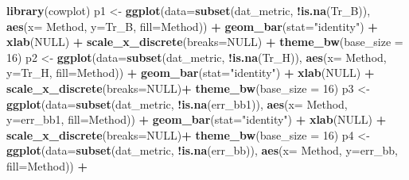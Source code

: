 \documentclass[
]{article}
\newenvironment{Shaded}{\begin{snugshade}}{\end{snugshade}}
\newcommand{\DataTypeTok}[1]{\textcolor[rgb]{0.13,0.29,0.53}{#1}}
\newcommand{\DecValTok}[1]{\textcolor[rgb]{0.00,0.00,0.81}{#1}}
\newcommand{\KeywordTok}[1]{\textcolor[rgb]{0.13,0.29,0.53}{\textbf{#1}}}
\newcommand{\NormalTok}[1]{#1}
\newcommand{\OperatorTok}[1]{\textcolor[rgb]{0.81,0.36,0.00}{\textbf{#1}}}
\newcommand{\OtherTok}[1]{\textcolor[rgb]{0.56,0.35,0.01}{#1}}
\newcommand{\StringTok}[1]{\textcolor[rgb]{0.31,0.60,0.02}{#1}}
\begin{document}
\begin{Shaded}
\begin{Highlighting}[]
\KeywordTok{library}\NormalTok{(cowplot)}
\NormalTok{p1 <-}\StringTok{ }\KeywordTok{ggplot}\NormalTok{(}\DataTypeTok{data=}\KeywordTok{subset}\NormalTok{(dat_metric, }\OperatorTok{!}\KeywordTok{is.na}\NormalTok{(Tr_B)), }\KeywordTok{aes}\NormalTok{(}\DataTypeTok{x=}\NormalTok{ Method, }\DataTypeTok{y=}\NormalTok{Tr_B, }\DataTypeTok{fill=}\NormalTok{Method)) }\OperatorTok{+}
\StringTok{  }\KeywordTok{geom_bar}\NormalTok{(}\DataTypeTok{stat=}\StringTok{"identity"}\NormalTok{) }\OperatorTok{+}\StringTok{ }\KeywordTok{xlab}\NormalTok{(}\OtherTok{NULL}\NormalTok{) }\OperatorTok{+}\StringTok{ }\KeywordTok{scale_x_discrete}\NormalTok{(}\DataTypeTok{breaks=}\OtherTok{NULL}\NormalTok{) }\OperatorTok{+}\StringTok{ }\KeywordTok{theme_bw}\NormalTok{(}\DataTypeTok{base_size =} \DecValTok{16}\NormalTok{)}
\NormalTok{p2 <-}\StringTok{ }\KeywordTok{ggplot}\NormalTok{(}\DataTypeTok{data=}\KeywordTok{subset}\NormalTok{(dat_metric, }\OperatorTok{!}\KeywordTok{is.na}\NormalTok{(Tr_H)), }\KeywordTok{aes}\NormalTok{(}\DataTypeTok{x=}\NormalTok{ Method, }\DataTypeTok{y=}\NormalTok{Tr_H, }\DataTypeTok{fill=}\NormalTok{Method)) }\OperatorTok{+}
\StringTok{  }\KeywordTok{geom_bar}\NormalTok{(}\DataTypeTok{stat=}\StringTok{"identity"}\NormalTok{) }\OperatorTok{+}\StringTok{ }\KeywordTok{xlab}\NormalTok{(}\OtherTok{NULL}\NormalTok{) }\OperatorTok{+}\StringTok{ }\KeywordTok{scale_x_discrete}\NormalTok{(}\DataTypeTok{breaks=}\OtherTok{NULL}\NormalTok{)}\OperatorTok{+}\StringTok{ }\KeywordTok{theme_bw}\NormalTok{(}\DataTypeTok{base_size =} \DecValTok{16}\NormalTok{)}
\NormalTok{p3 <-}\StringTok{ }\KeywordTok{ggplot}\NormalTok{(}\DataTypeTok{data=}\KeywordTok{subset}\NormalTok{(dat_metric, }\OperatorTok{!}\KeywordTok{is.na}\NormalTok{(err_bb1)), }\KeywordTok{aes}\NormalTok{(}\DataTypeTok{x=}\NormalTok{ Method, }\DataTypeTok{y=}\NormalTok{err_bb1, }\DataTypeTok{fill=}\NormalTok{Method)) }\OperatorTok{+}
\StringTok{  }\KeywordTok{geom_bar}\NormalTok{(}\DataTypeTok{stat=}\StringTok{"identity"}\NormalTok{) }\OperatorTok{+}\StringTok{ }\KeywordTok{xlab}\NormalTok{(}\OtherTok{NULL}\NormalTok{) }\OperatorTok{+}\StringTok{ }\KeywordTok{scale_x_discrete}\NormalTok{(}\DataTypeTok{breaks=}\OtherTok{NULL}\NormalTok{)}\OperatorTok{+}\StringTok{ }\KeywordTok{theme_bw}\NormalTok{(}\DataTypeTok{base_size =} \DecValTok{16}\NormalTok{)}
\NormalTok{p4 <-}\StringTok{ }\KeywordTok{ggplot}\NormalTok{(}\DataTypeTok{data=}\KeywordTok{subset}\NormalTok{(dat_metric, }\OperatorTok{!}\KeywordTok{is.na}\NormalTok{(err_bb)), }\KeywordTok{aes}\NormalTok{(}\DataTypeTok{x=}\NormalTok{ Method, }\DataTypeTok{y=}\NormalTok{err_bb, }\DataTypeTok{fill=}\NormalTok{Method)) }\OperatorTok{+}

\end{Highlighting}
\end{Shaded}
\end{document}
